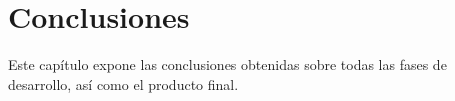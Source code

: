 \chapter{Conclusiones}
Este capítulo expone las conclusiones obtenidas sobre todas las fases de desarrollo, así como el producto final.